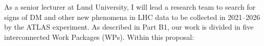 As a senior lecturer at Lund University, I will lead a research team to search for signs of DM and other new phenomena in LHC data to be collected in 2021--2026 by the ATLAS experiment. 
As described in Part B1, our work is divided in five interconnected Work Packages (WPs). Within this proposal:  

